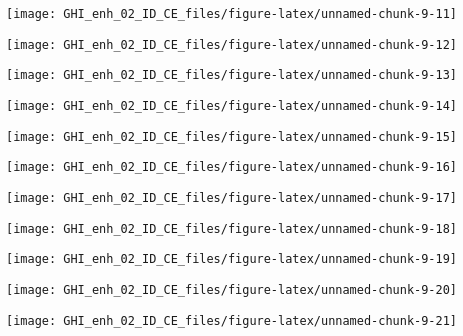 \documentclass[
  10pt,
  a4paper,oneside]{article}
\begin{document}
\begin{center}\texttt{[image: GHI\_enh\_02\_ID\_CE\_files/figure-latex/unnamed-chunk-9-11]} \end{center}

\begin{center}\texttt{[image: GHI\_enh\_02\_ID\_CE\_files/figure-latex/unnamed-chunk-9-12]} \end{center}

\begin{center}\texttt{[image: GHI\_enh\_02\_ID\_CE\_files/figure-latex/unnamed-chunk-9-13]} \end{center}

\begin{center}\texttt{[image: GHI\_enh\_02\_ID\_CE\_files/figure-latex/unnamed-chunk-9-14]} \end{center}

\begin{center}\texttt{[image: GHI\_enh\_02\_ID\_CE\_files/figure-latex/unnamed-chunk-9-15]} \end{center}

\begin{center}\texttt{[image: GHI\_enh\_02\_ID\_CE\_files/figure-latex/unnamed-chunk-9-16]} \end{center}

\begin{center}\texttt{[image: GHI\_enh\_02\_ID\_CE\_files/figure-latex/unnamed-chunk-9-17]} \end{center}

\begin{center}\texttt{[image: GHI\_enh\_02\_ID\_CE\_files/figure-latex/unnamed-chunk-9-18]} \end{center}

\begin{center}\texttt{[image: GHI\_enh\_02\_ID\_CE\_files/figure-latex/unnamed-chunk-9-19]} \end{center}

\begin{center}\texttt{[image: GHI\_enh\_02\_ID\_CE\_files/figure-latex/unnamed-chunk-9-20]} \end{center}

\begin{center}\texttt{[image: GHI\_enh\_02\_ID\_CE\_files/figure-latex/unnamed-chunk-9-21]} \end{center}
\end{document}

